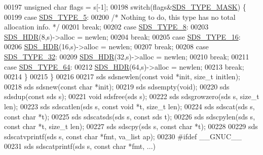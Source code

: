 \begin{DoxyCode}
00197     \textcolor{keywordtype}{unsigned} \textcolor{keywordtype}{char} flags = s[-1];
00198     \textcolor{keywordflow}{switch}(flags&\hyperlink{sds_8h_a07564783f389fdd7772a8f61d55d9ddf}{SDS\_TYPE\_MASK}) \{
00199         \textcolor{keywordflow}{case} \hyperlink{sds_8h_a3b7b67f1efa75f6b78ae18ea853b1a91}{SDS\_TYPE\_5}:
00200             \textcolor{comment}{/* Nothing to do, this type has no total allocation info. */}
00201             \textcolor{keywordflow}{break};
00202         \textcolor{keywordflow}{case} \hyperlink{sds_8h_a504136356f04bfa2fd616dd4c8fdd71c}{SDS\_TYPE\_8}:
00203             \hyperlink{sds_8h_a0f1b0d97d094e8505c1d46f95c6cbc30}{SDS\_HDR}(8,s)->alloc = newlen;
00204             \textcolor{keywordflow}{break};
00205         \textcolor{keywordflow}{case} \hyperlink{sds_8h_aa54044bf70a30824caeb1bab3615bff2}{SDS\_TYPE\_16}:
00206             \hyperlink{sds_8h_a0f1b0d97d094e8505c1d46f95c6cbc30}{SDS\_HDR}(16,s)->alloc = newlen;
00207             \textcolor{keywordflow}{break};
00208         \textcolor{keywordflow}{case} \hyperlink{sds_8h_a0ad2103bbdaa2fe5511ce3279cb42293}{SDS\_TYPE\_32}:
00209             \hyperlink{sds_8h_a0f1b0d97d094e8505c1d46f95c6cbc30}{SDS\_HDR}(32,s)->alloc = newlen;
00210             \textcolor{keywordflow}{break};
00211         \textcolor{keywordflow}{case} \hyperlink{sds_8h_ad03c6e0fdab3a871e10cce347e8bb4e6}{SDS\_TYPE\_64}:
00212             \hyperlink{sds_8h_a0f1b0d97d094e8505c1d46f95c6cbc30}{SDS\_HDR}(64,s)->alloc = newlen;
00213             \textcolor{keywordflow}{break};
00214     \}
00215 \}
00216 
00217 sds sdsnewlen(\textcolor{keyword}{const} \textcolor{keywordtype}{void} *init, size\_t initlen);
00218 sds sdsnew(\textcolor{keyword}{const} \textcolor{keywordtype}{char} *init);
00219 sds sdsempty(\textcolor{keywordtype}{void});
00220 sds sdsdup(\textcolor{keyword}{const} sds s);
00221 \textcolor{keywordtype}{void} sdsfree(sds s);
00222 sds sdsgrowzero(sds s, size\_t len);
00223 sds sdscatlen(sds s, \textcolor{keyword}{const} \textcolor{keywordtype}{void} *t, size\_t len);
00224 sds sdscat(sds s, \textcolor{keyword}{const} \textcolor{keywordtype}{char} *t);
00225 sds sdscatsds(sds s, \textcolor{keyword}{const} sds t);
00226 sds sdscpylen(sds s, \textcolor{keyword}{const} \textcolor{keywordtype}{char} *t, size\_t len);
00227 sds sdscpy(sds s, \textcolor{keyword}{const} \textcolor{keywordtype}{char} *t);
00228 
00229 sds sdscatvprintf(sds s, \textcolor{keyword}{const} \textcolor{keywordtype}{char} *fmt, va\_list ap);
00230 \textcolor{preprocessor}{#}\textcolor{preprocessor}{ifdef} \_\_GNUC\_\_
00231 sds sdscatprintf(sds s, \textcolor{keyword}{const} \textcolor{keywordtype}{char} *fmt, ...)

\end{DoxyCode}
